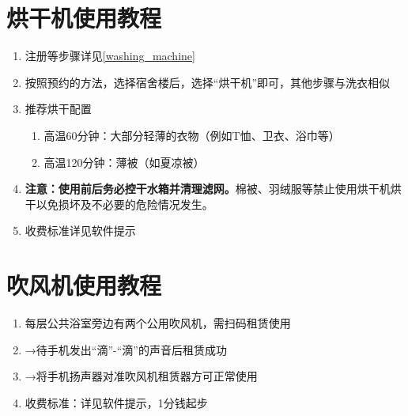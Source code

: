 \section[烘干机使用教程]{烘干机使用教程}
\label{dry_machine}
\begin{enumerate}
      \item 注册等步骤详见\uline{\ref{washing_machine}}
      \item 按照预约的方法，选择宿舍楼后，选择“烘干机”即可，其他步骤与洗衣相似
      \item 推荐烘干配置
            \begin{enumerate}
                  \item 高温60分钟：大部分轻薄的衣物（例如T恤、卫衣、浴巾等）
                  \item 高温120分钟：薄被（如夏凉被）
            \end{enumerate}
      \item \textbf{注意：}\textbf{使用前后务必控干水箱并清理滤网。}棉被、羽绒服等禁止使用烘干机烘干以免损坏及不必要的危险情况发生。
      \item 收费标准详见软件提示
\end{enumerate}

\section[吹风机使用教程]{吹风机使用教程}
\label{hair_drier}
\begin{enumerate}
      \item 每层公共浴室旁边有两个公用吹风机，需扫码\footnotemark 租赁使用
      \item →待手机发出“滴”-“滴”的声音后租赁成功
      \item →将手机扬声器对准吹风机租赁器方可正常使用
      \item 收费标准：详见软件提示，1分钱起步
\end{enumerate}

